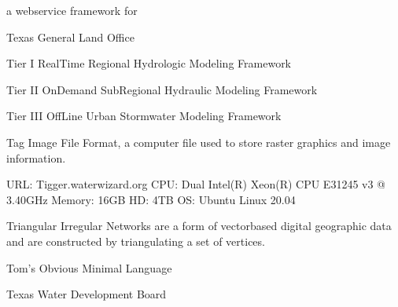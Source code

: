 \documentclass[letterpaper,12pt,english,openany,oneside]{sphinxmanual}
\begin{document}
\begin{description}
\sphinxAtStartPar
a webservice {\hyperref[\detokenize{_static/glossary:term-API}]{}} framework for {\hyperref[\detokenize{_static/glossary:term-Django}]{}}

\sphinxAtStartPar
Texas General Land Office

\sphinxAtStartPar
Tier I Real\sphinxhyphen{}Time Regional Hydrologic Modeling Framework

\sphinxAtStartPar
Tier II On\sphinxhyphen{}Demand Sub\sphinxhyphen{}Regional Hydraulic Modeling Framework

\sphinxAtStartPar
Tier III Off\sphinxhyphen{}Line Urban Stormwater Modeling Framework

\sphinxAtStartPar
Tag Image File Format, a computer file used to store raster graphics and image information.

\sphinxAtStartPar
URL: Tigger.water\sphinxhyphen{}wizard.org CPU: Dual Intel(R) Xeon(R) CPU E3\sphinxhyphen{}1245 v3 @ 3.40GHz Memory: 16GB HD: 4TB OS: Ubuntu Linux 20.04

\sphinxAtStartPar
Triangular Irregular Networks are a form of vector\sphinxhyphen{}based digital geographic data and are constructed by triangulating a set of vertices.

\sphinxAtStartPar
Tom’s Obvious Minimal Language

\sphinxAtStartPar
Texas Water Development Board


\end{description}
\end{document}
